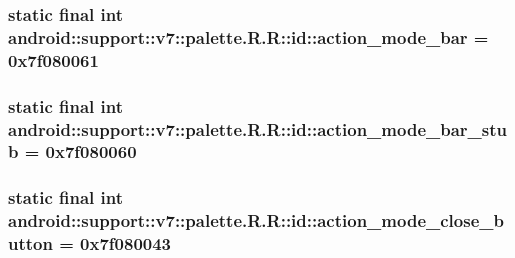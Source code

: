 \hypertarget{classandroid_1_1support_1_1v7_1_1palette_1_1_r_1_1id_656ceda680ed0956f2afc7975b04a33a}{
\subsubsection[{action\_\-mode\_\-bar}]{\setlength{\rightskip}{0pt plus 5cm}static final int android::support::v7::palette.R.R::id::action\_\-mode\_\-bar = 0x7f080061}}
\label{classandroid_1_1support_1_1v7_1_1palette_1_1_r_1_1id_656ceda680ed0956f2afc7975b04a33a}


\hypertarget{classandroid_1_1support_1_1v7_1_1palette_1_1_r_1_1id_1848cb925e02fb25b0ff362178e0fd09}{
\subsubsection[{action\_\-mode\_\-bar\_\-stub}]{\setlength{\rightskip}{0pt plus 5cm}static final int android::support::v7::palette.R.R::id::action\_\-mode\_\-bar\_\-stub = 0x7f080060}}
\label{classandroid_1_1support_1_1v7_1_1palette_1_1_r_1_1id_1848cb925e02fb25b0ff362178e0fd09}


\hypertarget{classandroid_1_1support_1_1v7_1_1palette_1_1_r_1_1id_12ab1626b4e35838bd318eb254aaecfc}{
\subsubsection[{action\_\-mode\_\-close\_\-button}]{\setlength{\rightskip}{0pt plus 5cm}static final int android::support::v7::palette.R.R::id::action\_\-mode\_\-close\_\-button = 0x7f080043}}
\label{classandroid_1_1support_1_1v7_1_1palette_1_1_r_1_1id_12ab1626b4e35838bd318eb254aaecfc}


